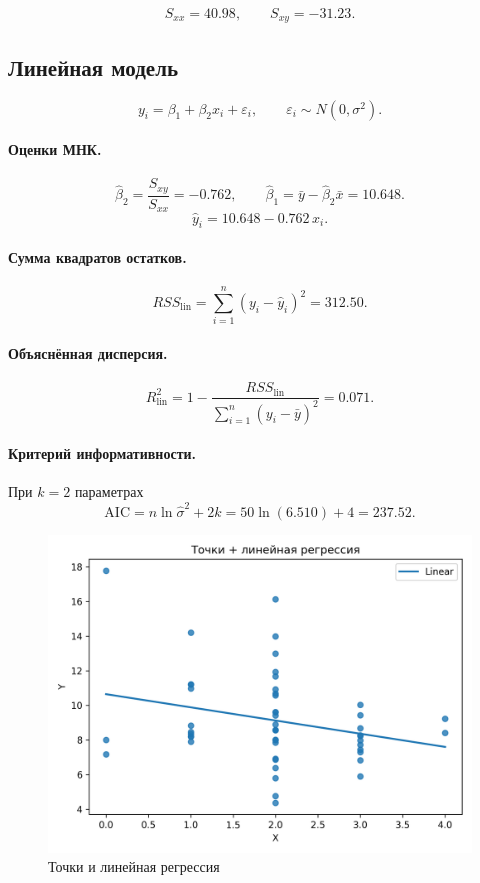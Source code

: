 \documentclass[areasetadvanced]{scrartcl}
\begin{document}
\[
\boxed{S_{xx}=40.98},\qquad
\boxed{S_{xy}=-31.23}.
\]

\subsection{Линейная модель}
\[
y_i=\beta_1+\beta_2x_i+\varepsilon_i,\qquad
\varepsilon_i\sim N(0,\sigma^2).
\]

\paragraph{Оценки МНК.}
\[
\hat\beta_2=\frac{S_{xy}}{S_{xx}}=-0.762,\qquad
\hat\beta_1=\bar y-\hat\beta_2\bar x=10.648.
\]
\[
\hat y_i = 10.648 - 0.762\,x_i.
\]

\paragraph{Сумма квадратов остатков.}
\[
RSS_{\text{lin}}
  =\sum_{i=1}^n (y_i-\hat y_i)^2 = 312.50.
\]

\paragraph{Объяснённая дисперсия.}
\[
R^2_{\text{lin}}
  =1-\frac{RSS_{\text{lin}}}{\displaystyle\sum_{i=1}^n(y_i-\bar y)^2}
  =0.071.
\]

\paragraph{Критерий информативности.}
При $k=2$ параметрах
\[
\boxed{\text{AIC}=n\ln\hat\sigma^2+2k
      =50\ln(6.510)+4 = 237.52}.
\]

\begin{figure}[H]
  \centering
  \includegraphics[width=.55\textwidth]{figs/task1_linear.png}
  \caption{Точки и линейная регрессия}
\end{figure}
\end{document}
